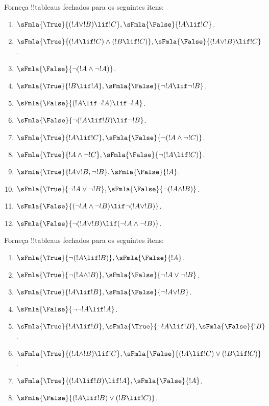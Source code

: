 \documentclass[../../../include/open-logic-section]{subfiles}
\begin{document}
\begin{prob}
Forneça !!{tableau}s fechados para os seguintes itens:
\begin{enumerate}
\item $\sFmla{\True}{(!A \lor !B) \lif !C}, \sFmla{\False}{!A \lif !C}$.
\item $\sFmla{\True}{(!A \lif !C) \land (!B \lif !C)}, \sFmla{\False}{(!A \lor !B) \lif !C}$.
\item $\sFmla{\False}{\lnot(!A \land \lnot !A)}$.
\item $\sFmla{\True}{!B \lif !A}, \sFmla{\False}{\lnot !A \lif \lnot !B}$.
\item $\sFmla{\False}{(!A \lif \lnot !A) \lif \lnot !A}$.
\item $\sFmla{\False}{\lnot(!A \lif !B) \lif \lnot !B}$.
\item $\sFmla{\True}{!A \lif !C}, \sFmla{\False}{\lnot (!A \land \lnot !C)}$.
\item $\sFmla{\True}{!A \land \lnot !C}, \sFmla{\False}{\lnot (!A \lif !C)}$.
\item $\sFmla{\True}{!A \lor !B, \lnot !B}, \sFmla{\False}{!A}$.
\item $\sFmla{\True}{\lnot !A \lor \lnot !B}, \sFmla{\False}{\lnot(!A \land !B)}$.
\item $\sFmla{\False}{(\lnot !A \land \lnot !B) \lif\lnot(!A \lor !B)}$.
\item $\sFmla{\False}{\lnot(!A \lor !B) \lif (\lnot !A \land \lnot !B)}$.
\end{enumerate}
\end{prob}

\begin{prob}
Forneça !!{tableau}s fechados para os seguintes itens:
\begin{enumerate}
\item $\sFmla{\True}{\lnot(!A \lif !B)}, \sFmla{\False}{!A}$.
\item $\sFmla{\True}{\lnot(!A \land !B)}, \sFmla{\False}{\lnot !A \lor \lnot !B}$.
\item $\sFmla{\True}{!A \lif !B}, \sFmla{\False}{\lnot !A \lor !B}$.
\item $\sFmla{\False}{\lnot \lnot !A \lif !A}$.
\item $\sFmla{\True}{!A \lif !B}, \sFmla{\True}{\lnot !A \lif !B}, \sFmla{\False}{!B}$.
\item $\sFmla{\True}{(!A \land !B) \lif !C}, \sFmla{\False}{(!A \lif !C) \lor (!B \lif !C)}$.
\item $\sFmla{\True}{(!A \lif !B) \lif !A}, \sFmla{\False}{!A}$.
\item $\sFmla{\False}{(!A \lif !B) \lor (!B \lif !C)}$.
\end{enumerate}
\end{prob}
\end{document}
